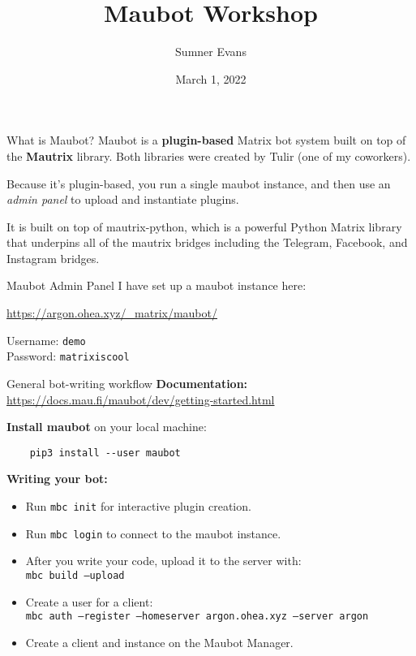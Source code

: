 \documentclass{acm}
\title{Maubot Workshop}
\author{Sumner Evans}
\institute{Beeper}
\date{March 1, 2022}
\begin{document}
\begin{frame}{What is Maubot?}
    Maubot is a \textbf{plugin-based} Matrix bot system built on top of the
    \textbf{Mautrix} library. Both libraries were created by Tulir (one of my
    coworkers).

    \pause
    Because it's plugin-based, you run a single maubot instance, and then use an
    \textit{admin panel} to upload and instantiate plugins.

    \pause
    It is built on top of mautrix-python, which is a powerful Python Matrix
    library that underpins all of the mautrix bridges including the Telegram,
    Facebook, and Instagram bridges.
\end{frame}

\begin{frame}{Maubot Admin Panel}
    I have set up a maubot instance here:

    \begin{center}
        \Large
        \url{https://argon.ohea.xyz/_matrix/maubot/}
    \end{center}

    Username: \texttt{demo} \\
    Password: \texttt{matrixiscool}
\end{frame}

\begin{frame}[fragile]{General bot-writing workflow}
    \textbf{Documentation:}
    \url{https://docs.mau.fi/maubot/dev/getting-started.html}

    \bigskip

    \textbf{Install maubot} on your local machine:
    \begin{verbatim}
    pip3 install --user maubot
    \end{verbatim}

    \textbf{Writing your bot:}
    \begin{itemize}
        \item Run \texttt{mbc init} for interactive plugin creation.
        \item Run \texttt{mbc login} to connect to the maubot instance.
        \item After you write your code, upload it to the server with: \\
            \texttt{mbc build --upload}
        \item Create a user for a client: \\
            \texttt{mbc auth --register --homeserver argon.ohea.xyz --server argon}
        \item Create a client and instance on the Maubot Manager.
    \end{itemize}
\end{frame}
\end{document}
